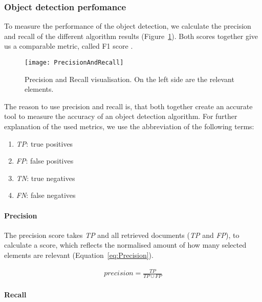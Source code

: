 \subsubsection{Object detection perfomance}
\label{sub:ObjectDetectionPerfomance}

To measure the performance of the object detection, we calculate the precision and recall of the different algorithm results (Figure~\ref{fig:PrecisionAndRecall}). Both scores together give us a comparable metric, called F1 score \citep{sokolova_lapalme_2009}.

\begin{figure}[H]
	\centering
	\texttt{[image: PrecisionAndRecall]}
	\caption{Precision and Recall visualisation. On the left side are the relevant elements.}
	\label{fig:PrecisionAndRecall}
\end{figure}

The reason to use precision and recall is, that both together create an accurate tool to measure the accuracy of an object detection algorithm. For further explanation of the used metrics, we use the abbreviation of the following terms:

\begin{enumerate}[label=]
    \item \textit{TP}: true positives
    \item \textit{FP}: false positives
    \item \textit{TN}: true negatives
    \item \textit{FN}: false negatives
\end{enumerate}

\paragraph{Precision}
\label{sub:Precision}

The precision score takes \textit{TP} and all retrieved documents (\textit{TP} and \textit{FP}), to calculate a score, which reflects the normalised amount of how many selected elements are relevant (Equation~\ref{eq:Precision}).

\begin{equation} \label{eq:Precision}
\begin{gathered}
precision = \frac{TP}{TP \cup  FP}
\end{gathered}
\end{equation}

\paragraph{Recall}
\label{sub:recall}

